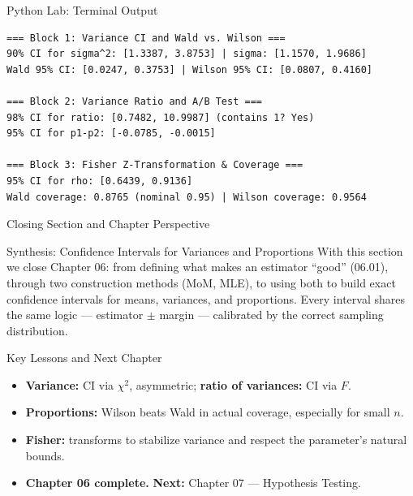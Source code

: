 \documentclass[aspectratio=169,xcolor={dvipsnames,table}]{beamer}
\begin{document}
\begin{frame}[fragile]{Python Lab: Terminal Output}
	\vspace{-0.1cm}
	\begin{block}{}
		\fontsize{4pt}{5pt}\selectfont
		\begin{verbatim}
=== Block 1: Variance CI and Wald vs. Wilson ===
90% CI for sigma^2: [1.3387, 3.8753] | sigma: [1.1570, 1.9686]
Wald 95% CI: [0.0247, 0.3753] | Wilson 95% CI: [0.0807, 0.4160]

=== Block 2: Variance Ratio and A/B Test ===
98% CI for ratio: [0.7482, 10.9987] (contains 1? Yes)
95% CI for p1-p2: [-0.0785, -0.0015]

=== Block 3: Fisher Z-Transformation & Coverage ===
95% CI for rho: [0.6439, 0.9136]
Wald coverage: 0.8765 (nominal 0.95) | Wilson coverage: 0.9564
		\end{verbatim}
	\end{block}
\end{frame}


\begin{frame}{Closing Section and Chapter Perspective}
	\vspace{-0.2cm}
	\begin{block}{Synthesis: Confidence Intervals for Variances and Proportions}
		\scriptsize
		With this section we close Chapter 06: from defining what makes an estimator ``good'' (06.01), through two construction methods (MoM, MLE), to using both to build exact confidence intervals for means, variances, and proportions. Every interval shares the same logic --- estimator $\pm$ margin --- calibrated by the correct sampling distribution.
	\end{block}
	\vspace{0.05cm}
	\pause
	\begin{alertblock}{Key Lessons and Next Chapter}
		\begin{itemize}\itemsep=0.05cm
			\item \textbf{Variance:} CI via $\chi^2$, asymmetric; \textbf{ratio of variances:} CI via $F$.
			\item \textbf{Proportions:} Wilson beats Wald in actual coverage, especially for small $n$.
			\item \textbf{Fisher:} transforms to stabilize variance and respect the parameter's natural bounds.
			\item \textbf{Chapter 06 complete.} \textbf{Next:} \textcolor{TecRojo}{Chapter 07 --- Hypothesis Testing}.
		\end{itemize}
	\end{alertblock}
\end{frame}
\end{document}
